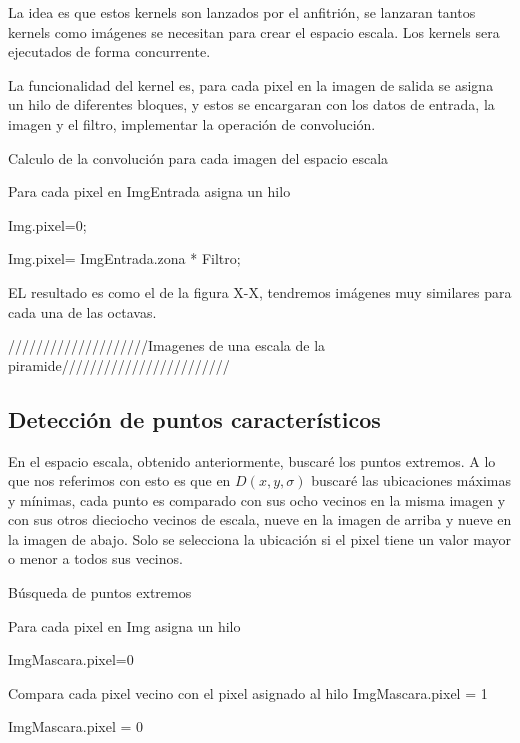 La idea es que estos kernels son lanzados por el anfitrión, se lanzaran tantos kernels como imágenes se necesitan para crear el espacio escala. Los kernels sera ejecutados de forma concurrente. 

La funcionalidad del kernel es, para cada pixel en la imagen de salida se asigna un hilo de diferentes bloques, y estos se encargaran con los datos de entrada, la imagen y el filtro, implementar la operación de convolución.\\

\begin{algorithm}[H]
\caption{Calculo de la convolución para cada imagen del espacio escala}
 Para cada pixel en ImgEntrada asigna un hilo\;
 
 {
	{
		Img.pixel=0;
	}{
		
		Img.pixel= ImgEntrada.zona * Filtro; 
		\\
		}
 }
	

\end{algorithm}



EL resultado es como el de la figura X-X, tendremos imágenes muy similares para cada una de las octavas.

////////////////////Imagenes de una escala de la piramide////////////////////////
 
\subsection{Detección de puntos característicos}
En el espacio escala, obtenido anteriormente, buscaré los puntos extremos. A lo que nos referimos con esto es que en $D(x,y,\sigma)$ buscaré las ubicaciones máximas y mínimas, cada punto es comparado con sus ocho vecinos en la misma imagen y con sus otros dieciocho vecinos de escala, nueve en la imagen de arriba y nueve en la imagen de abajo. Solo se selecciona la ubicación si el pixel tiene un valor mayor o menor a todos sus vecinos.\\


\begin{algorithm}[H]
\caption{Búsqueda de puntos extremos}
 Para cada pixel en Img asigna un hilo\;
 
 {
	{
		ImgMascara.pixel=0\;
	}{
		{
			Compara cada pixel vecino con el pixel asignado al hilo\;
			{
				ImgMascara.pixel = 1\;			
			}{
				ImgMascara.pixel = 0\;
			
			}
		
		}
		
	}
 }
	
\end{algorithm}


